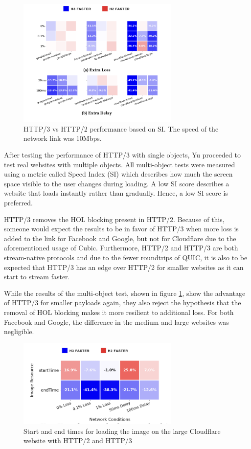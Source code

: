 \documentclass[conference]{IEEEtran}
\begin{document}
\begin{figure}[htbp]
\includegraphics[width=8cm,keepaspectratio]{images/Yu2/HTTP3 Multiple objects benchmark.png}
\caption{HTTP/3 vs HTTP/2 performance based on SI. The speed of the network link was 10Mbps.}
\label{fig:yu2-http3-multiple-object-benchmark}
\end{figure}

After testing the performance of HTTP/3 with single objects, Yu proceeded to test real websites with multiple objects. All multi-object tests were measured using a metric called Speed Index (SI) which describes how much the screen space visible to the user changes during loading. A low SI score describes a website that loads instantly rather than gradually. Hence, a low SI score is preferred.

HTTP/3 removes the HOL blocking present in HTTP/2. Because of this, someone would expect the results to be in favor of HTTP/3 when more loss is added to the link for Facebook and Google, but not for Cloudflare due to the aforementioned usage of Cubic. Furthermore, HTTP/2 and HTTP/3 are both stream-native protocols and due to the fewer roundtrips of QUIC, it is also to be expected that HTTP/3 has an edge over HTTP/2 for smaller websites as it can start to stream faster.

While the results of the multi-object test, shown in figure \ref{fig:yu2-http3-multiple-object-benchmark}, show the advantage of HTTP/3 for smaller payloads again, they also reject the hypothesis that the removal of HOL blocking makes it more resilient to additional loss. For both Facebook and Google, the difference in the medium and large websites was negligible. 

\begin{figure}[htbp]
  \begin{center}
  \includegraphics[width=8cm,keepaspectratio]{images/Yu2/Image load comparison.png}
  \caption{Start and end times for loading the image on the large Cloudflare website with HTTP/2 and HTTP/3}
  \label{fig:yu2-image-load-comparison}
  \end{center}
\end{figure}
\end{document}
